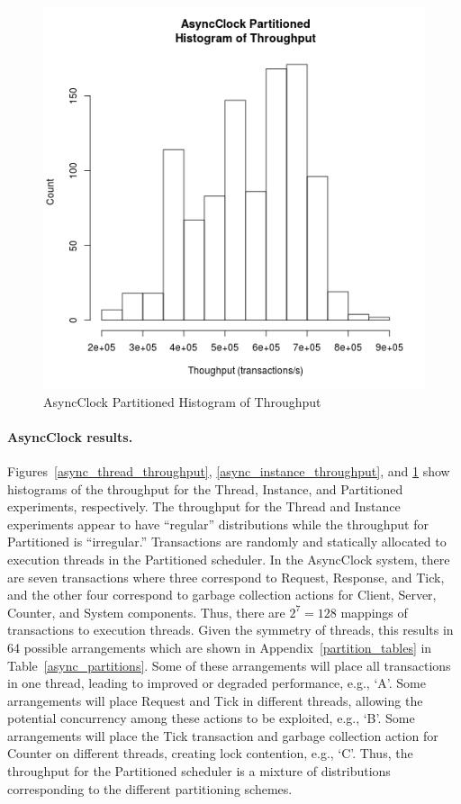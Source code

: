 \begin{figure}[H]
\center
\includegraphics[height=.4\textheight]{async_partitioned_throughput_hist.png}
\caption{AsyncClock Partitioned Histogram of Throughput\label{async_partitioned_throughput}}
\end{figure}

\paragraph{AsyncClock results.}
Figures~\ref{async_thread_throughput}, \ref{async_instance_throughput}, and \ref{async_partitioned_throughput} show histograms of the throughput for the Thread, Instance, and Partitioned experiments, respectively.
The throughput for the Thread and Instance experiments appear to have ``regular'' distributions while the throughput for Partitioned is ``irregular.''
Transactions are randomly and statically allocated to execution threads in the Partitioned scheduler.
In the AsyncClock system, there are seven transactions where three correspond to Request, Response, and Tick, and the other four correspond to garbage collection actions for Client, Server, Counter, and System components.
Thus, there are $2^7 = 128$ mappings of transactions to execution threads.
Given the symmetry of threads, this results in 64 possible arrangements which are shown in Appendix~\ref{partition_tables} in Table~\ref{async_partitions}.
Some of these arrangements will place all transactions in one thread, leading to improved or degraded performance, e.g., `A'.
Some arrangements will place Request and Tick in different threads, allowing the potential concurrency among these actions to be exploited, e.g., `B'.
Some arrangements will place the Tick transaction and garbage collection action for Counter on different threads, creating lock contention, e.g., `C'.
Thus, the throughput for the Partitioned scheduler is a mixture of distributions corresponding to the different partitioning schemes.

